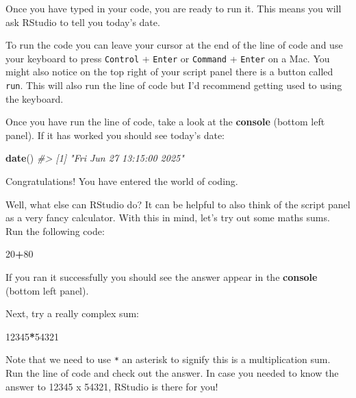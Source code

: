 \documentclass[
]{book}
\newenvironment{Shaded}{\begin{snugshade}}{\end{snugshade}}
\newcommand{\CommentTok}[1]{\textcolor[rgb]{0.56,0.35,0.01}{\textit{#1}}}
\newcommand{\DecValTok}[1]{\textcolor[rgb]{0.00,0.00,0.81}{#1}}
\newcommand{\FunctionTok}[1]{\textcolor[rgb]{0.13,0.29,0.53}{\textbf{#1}}}
\newcommand{\NormalTok}[1]{#1}
\newcommand{\SpecialCharTok}[1]{\textcolor[rgb]{0.81,0.36,0.00}{\textbf{#1}}}
\begin{document}
Once you have typed in your code, you are ready to run it. This means you will ask RStudio to tell you today's date.

To run the code you can leave your cursor at the end of the line of code and use your keyboard to press \texttt{Control} + \texttt{Enter} or \texttt{Command} + \texttt{Enter} on a Mac. You might also notice on the top right of your script panel there is a button called \texttt{run}. This will also run the line of code but I'd recommend getting used to using the keyboard.

\newpage

Once you have run the line of code, take a look at the \textbf{console} (bottom left panel). If it has worked you should see today's date:

\begin{Shaded}
\begin{Highlighting}[]
\FunctionTok{date}\NormalTok{()}
\CommentTok{\#\textgreater{} [1] "Fri Jun 27 13:15:00 2025"}
\end{Highlighting}
\end{Shaded}

Congratulations! You have entered the world of coding.

Well, what else can RStudio do? It can be helpful to also think of the script panel as a very fancy calculator. With this in mind, let's try out some maths sums. Run the following code:

\begin{Shaded}
\begin{Highlighting}[]
\DecValTok{20}\SpecialCharTok{+}\DecValTok{80}
\end{Highlighting}
\end{Shaded}

If you ran it successfully you should see the answer appear in the \textbf{console} (bottom left panel).

Next, try a really complex sum:

\begin{Shaded}
\begin{Highlighting}[]
\DecValTok{12345}\SpecialCharTok{*}\DecValTok{54321}
\end{Highlighting}
\end{Shaded}

Note that we need to use \texttt{*} an asterisk to signify this is a multiplication sum. Run the line of code and check out the answer. In case you needed to know the answer to 12345 x 54321, RStudio is there for you!
\end{document}
